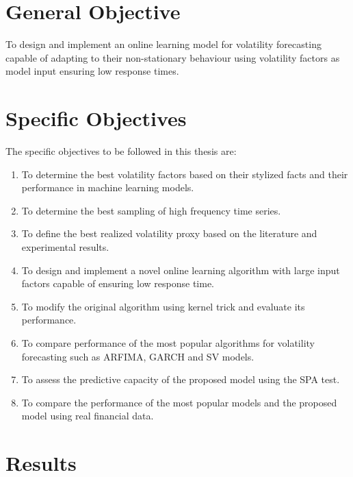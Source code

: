 \section{General Objective}
To design and implement an online learning model for volatility forecasting capable of adapting to their non-stationary behaviour using volatility factors as model input ensuring low response times.  
\section{Specific Objectives}
The specific objectives to be followed in this thesis are:
\begin{enumerate}
  \item To determine the best volatility factors based on their stylized facts and their performance in machine learning models.
  \item To determine the best sampling of high frequency time series.
  \item To define the best realized volatility proxy based on the literature and experimental results.
  \item To design and implement a novel online learning algorithm with large input factors capable of ensuring low response time.
  \item To modify the original algorithm using kernel trick and evaluate its performance.
  \item To compare performance of the most popular algorithms for volatility forecasting such as ARFIMA, GARCH and SV models.
  \item To assess the predictive capacity of the proposed model using the SPA test.
  \item To compare the performance of the most popular models and the proposed model using real financial data.
\end{enumerate}

\section{Results}

